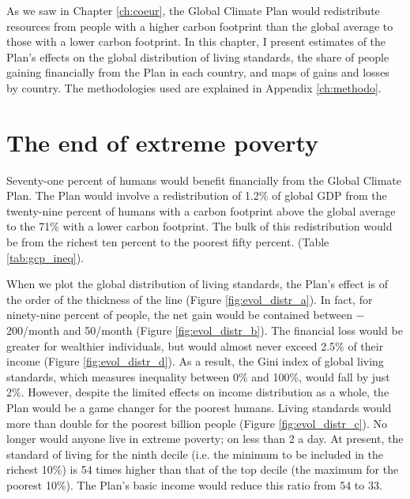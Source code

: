 \documentclass[a5paper,english,openany]{memoir}
\begin{document}
As we saw in Chapter \ref{ch:coeur}, the Global Climate Plan would redistribute resources from people with a higher carbon footprint than the global average to those with a lower carbon footprint. In this chapter, I present estimates of the Plan's effects on the global distribution of living standards, the share of people gaining financially from the Plan in each country, and maps of gains and losses by country. The methodologies used %
are explained in Appendix \ref{ch:methodo}.

\section{The end of extreme poverty}\label{sec:fin_pauvrete}

Seventy-one percent %
of humans would benefit financially from the Global Climate Plan. The Plan would involve a redistribution of 1.2\% of global GDP from the twenty-nine percent %
of humans with a carbon footprint above the global average to the 71\% with a lower carbon footprint. The bulk of this redistribution would be from the richest ten percent %
to the poorest fifty percent. %
(Table \ref{tab:gcp_ineq}). 



When we plot the global distribution of living standards, the Plan's effect is of the order of the thickness of the line (Figure \ref{fig:evol_distr_a}). In fact, %
for ninety-nine percent %
of people, the net gain would be contained between $-$200\textit{\texteuro{}}/month and 50\textit{\texteuro{}}/month (Figure \ref{fig:evol_distr_b}). The financial loss would be greater for wealthier individuals, but would almost never exceed 2.5\% of their %
income (Figure \ref{fig:evol_distr_d}). As a result, the Gini index of global living standards, which measures inequality between 0\% and 100\%, would fall by just 2\%. 
However, despite the limited effects on income distribution as a whole, the Plan would be a game changer %
for the poorest humans. Living standards would more than double for the poorest billion people (Figure \ref{fig:evol_distr_c}). No longer would anyone live in extreme poverty; on less than \textit{\texteuro{}}2 a day. %
At present, the standard of living for the %
ninth decile (i.e. the minimum to be included in the richest 10\%) is 54 times higher than that of the top %
decile (the maximum for the poorest 10\%). The Plan's basic income would reduce this ratio from 54 to 33. 
\end{document}
